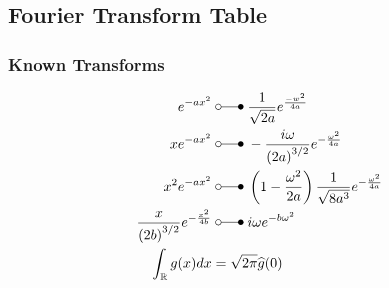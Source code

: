 \subsection{Fourier Transform Table}
\subsubsection{Known Transforms}\label{known_transforms}
\noindent
\begin{align*}
    e^{-ax^2}                                & \;\laplace\; \frac1{\sqrt{2a}}e^{\frac{-w^2}{4a}}                                               \\
    xe^{-ax^2}                               & \;\laplace\; -\frac{i\omega}{{(2a)}^{3/2}}e^{-\frac{\omega^2}{4a}}                              \\
    x^2e^{-ax^2}                             & \;\laplace\; \left( 1-\frac{\omega^2}{2a} \right) \frac{1}{\sqrt{8a^3}}e^{-\frac{\omega^2}{4a}} \\
    \frac x{{(2b)}^{3/2}}e^{-\frac{x^2}{4b}} & \;\laplace\; i\omega e^{-b\omega^2}                                                             \\
    \int_{\mathbb{R}}g(x)dx                  & = \sqrt{2\pi}\widehat{g}(0)
\end{align*}

